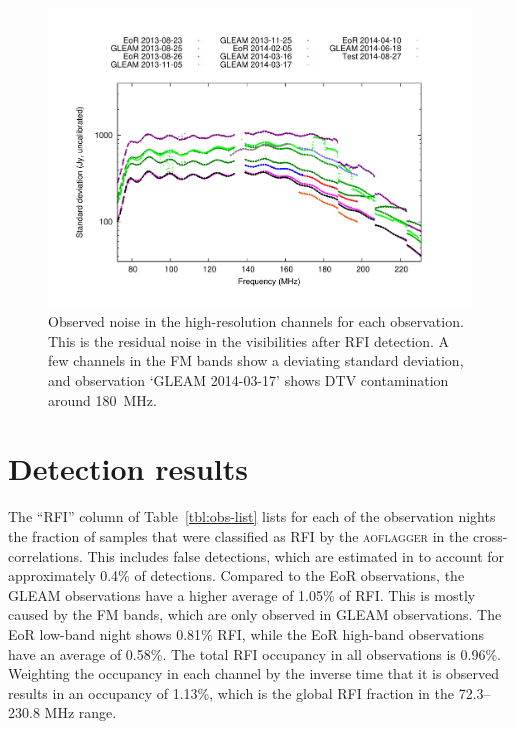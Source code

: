 \documentclass{pasa}
\begin{document}
\noindent\begin{figure}
\begin{center}\hspace*{-0.2cm}\includegraphics[width=18cm]{img/plot-stddev-per-set}\vspace{-1cm}
\caption{Observed noise in the high-resolution channels for each observation. This is the residual noise in the visibilities after RFI detection. A few channels in the FM bands show a deviating standard deviation, and observation `GLEAM 2014-03-17' shows DTV contamination around 180~MHz.}
\label{fig:stddev-per-set}
\end{center}
\end{figure}

\section{Detection results} \label{ch:detection-results}
The ``RFI'' column of Table~\ref{tbl:obs-list} lists for each of the observation nights the fraction of samples that were classified as RFI by the \textsc{aoflagger} in the cross-correlations. This includes false detections, which are estimated in \citet{lofar-radio-environment} to account for approximately 0.4\% of detections. Compared to the EoR observations, the GLEAM observations have a higher average of 1.05\% of RFI. This is mostly caused by the FM bands, which are only observed in GLEAM observations. The EoR low-band night shows 0.81\% RFI, while the EoR high-band observations have an average of 0.58\%. The total RFI occupancy in all observations is 0.96\%. Weighting the occupancy in each channel by the inverse time that it is observed results in an occupancy of 1.13\%, which is the global RFI fraction in the 72.3--230.8 MHz range.
\end{document}
